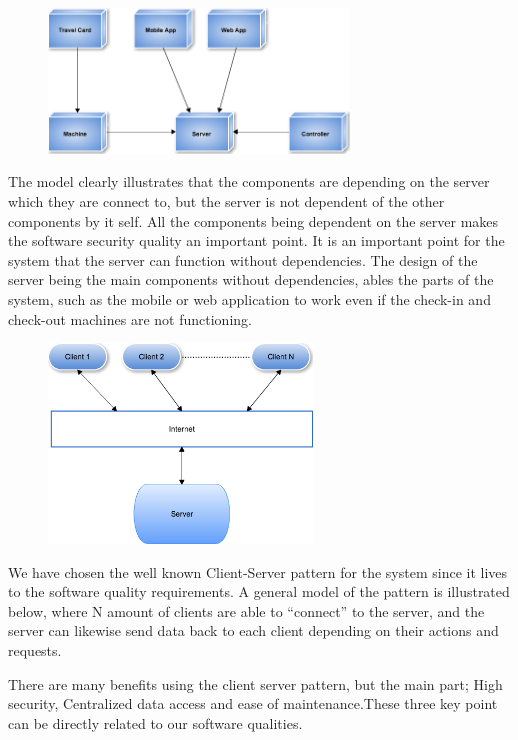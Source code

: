 \begin{figure}[ht!]
\centering
\includegraphics[width=80mm]{graphics/SA_pic_2.png}
\label{ano}
\end{figure}


The model clearly illustrates that the components are depending on the server which they are connect to, but the server is not dependent of the other components by it self. All the components being dependent on the server makes the software security quality an important point. It is an important point for the system that the server can function without dependencies. The  design of the server being the main components without dependencies, ables the parts of the system, such as the mobile or web application to work even if the check-in and check-out machines are not functioning.

\begin{figure}[ht!]
\centering
\includegraphics[width=70mm]{graphics/SA_pic_3.png}
\label{some}
\end{figure}

We have chosen the well known Client-Server pattern for the system since it lives to the software quality requirements. A general model of the pattern is illustrated below, where N amount of clients are able to “connect” to the server, and the server can likewise send data back to each client depending on their actions and requests.



There are many benefits using the client server pattern, but the main part; High security, Centralized data access and ease of maintenance.These three key point can be directly related to our software qualities. 



